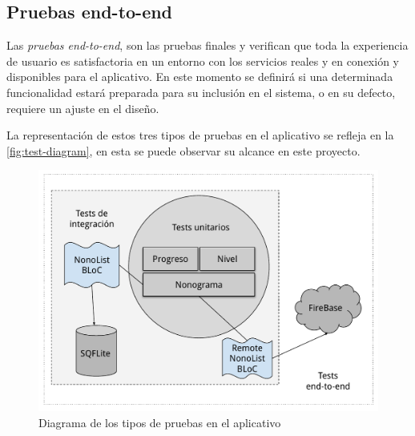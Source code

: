  \subsection{Pruebas end-to-end}
 Las \textit{pruebas end-to-end}, son las pruebas finales y verifican que
 toda la experiencia de usuario es satisfactoria en un entorno con los servicios reales
 y en conexión y disponibles para el aplicativo. En este momento se definirá si una
 determinada funcionalidad estará preparada para su inclusión en el sistema,
 o en su defecto, requiere un ajuste en el diseño.

 La representación de estos tres tipos de pruebas en el aplicativo se refleja en la \autoref{fig:test-diagram}, en
 esta se puede observar su alcance en este proyecto.

 \begin{figure}[H]
    \centering
    \includegraphics[scale=0.5]{images/testdiagram.pdf}
    \caption{Diagrama de los tipos de pruebas en el aplicativo}
    \label{fig:test-diagram}
\end{figure}